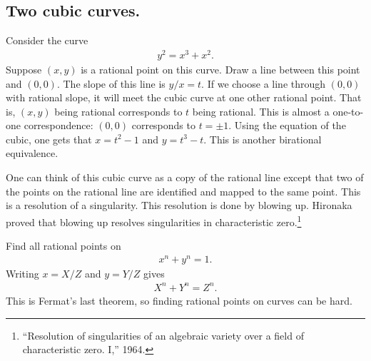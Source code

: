 \documentclass [11 pt, oneside] {article}
\begin{document}
\subsection{Two cubic curves.}
Consider the curve
\begin{align*}
	y^2 = x^3 + x^2.
\end{align*}
Suppose $(x,y)$ is a rational point on this curve. Draw a line between this point and $(0,0)$. The slope of this line is $y/x=t$. If we choose a line through $(0,0)$ with rational slope, it will meet the cubic curve at one other rational point. That is, $(x,y)$ being rational corresponds to $t$ being rational. This is almost a one-to-one correspondence: $(0,0)$ corresponds to $t = \pm 1$. Using the equation of the cubic, one gets that $x=t^2-1$ and $y=t^3-t$. This is another birational equivalence.

One can think of this cubic curve as a copy of the rational line except that two of the points on the rational line are identified and mapped to the same point. This is a resolution of a singularity. This resolution is done by blowing up. Hironaka proved that blowing up resolves singularities in characteristic zero.\footnote{``Resolution of singularities of an algebraic variety over a field of characteristic zero. I,'' 1964.}

\begin{example}[ ]
Find all rational points on 
\begin{align*}
	x^n+y^n = 1.
\end{align*}
Writing $x=X/Z$ and $y=Y/Z$ gives
\begin{align*}
	X^n + Y^n = Z^n.
\end{align*}
This is Fermat's last theorem, so finding rational points on curves can be hard.
\end{example}
\end{document}
